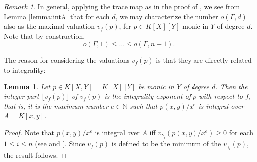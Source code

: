 \documentclass[a4paper,11pt]{amsart}%
\theoremstyle{definition}
\theoremstyle{plain}
\newtheorem{lemma}[defn]{Lemma}
\theoremstyle{remark}
\newtheorem{remark}[defn]{Remark}
\newtheorem{example}[defn]{Example}
\DeclareMathOperator{\Int}{Int}
\begin{document}

\begin{remark}
\label{rem:prop-max-val}
In general, applying the trace map as in the proof of \cite[Theorem 5.1]{vanHoeij94},
we see from Lemma \ref{lemma:intA} that for each $d$, we may characterize
the number $o(\varGamma,d)$ also as the maximal valuation $v_{f}(p)$, 
for $p\in K[X][Y]$ monic in $Y$ of degree $d$. Note that by construction, 
$$o(\varGamma,1)\leq \dots \leq o(\varGamma,n-1).$$
\end{remark}

The reason for considering the valuations $v_{f}(p)$ is that they are 
directly related to integrality:

\begin{lemma}
\label{lemma:integrality} Let $p\in K[X,Y]=K[X][Y]$ be monic in $Y$ of degree
$d$. Then the integer part $\lfloor v_{f}(p)\rfloor$ of $v_{f}(p)$ is the
integrality exponent of $p$ with respect to $f$, that is, it is the maximum number $e \in{\mathbb{N}}$ such that $p(x,y)/x^{e}$ is integral over
$A=K[x,y]$.
\end{lemma}

\begin{proof}
Note that $p(x,y)/x^{e}$ is integral over $A$ iff $v_{\gamma_{i}}(p(x,y)/x^{e}) \ge0$ 
for each $1 \le i \le n$ (see \cite[Theorem 3.2.6]{Stichtenoth08} and 
\cite[Section 2.4]{vanHoeij94}).  Since $v_{f}(p)$ is defined to be the minimum 
of the $v_{\gamma_{i}}(p)$, the result follows.
\end{proof}
\end{document}
